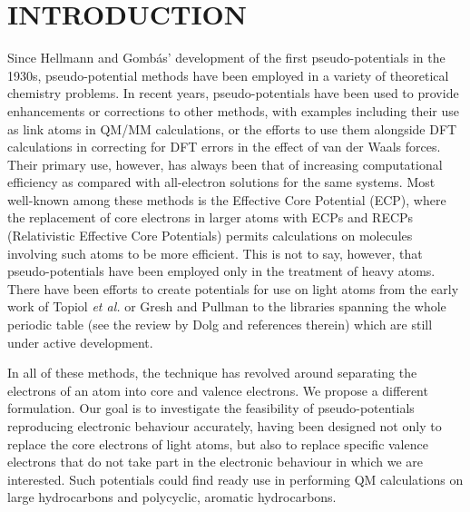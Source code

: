 \documentclass[12pt]{article}
\begin{document}
\makeatletter
\renewcommand\@biblabel[1]{#1.}
\makeatother



\renewcommand{\baselinestretch}{1.5}
\normalsize

\clearpage

\section*{\sffamily \Large INTRODUCTION}

Since Hellmann and Gomb\'as' development of the first pseudo-potentials in the 1930s,\cite{hellmann_1935, gombas_1935} pseudo-potential methods have been employed in a variety of theoretical chemistry problems. In recent years, pseudo-potentials have been used to provide enhancements or corrections to other methods, with examples including their use as link atoms in QM/MM calculations,\cite{chung_oniom_2015,
ihrig_specific_2011,
zhang_pseudobond_1998,
dilabio_simple_2002,
dilabio_efficient_2005,
gao_generalized_1998,
assfeld_quantum_1996,
jacob_calculation_2006,
von_lilienfeld_variational_2004,
von_lilienfeld_performance_2005,
von_lilienfeld_optimization_2004,
goedecker_separable_1996,
hartwigsen_relativistic_1998,
singh_combined_1986,
zhang_improved_2004,
parks_pseudobond_2008,
hitzenberger_optimizing_2016,
hitzenberger_probing_2015,
collins_energy-based_2015,
pezeshki_recent_2015,
von_lilienfeld_force_2013} or the efforts to use them alongside DFT calculations in correcting for DFT errors in the effect of van der Waals forces.\cite{dilabio_2008} Their primary use, however, has always been that of increasing computational efficiency as compared with all-electron solutions for the same systems. Most well-known among these methods is the Effective Core Potential (ECP),\cite{dolg_2000} where the replacement of core electrons in larger atoms with ECPs and RECPs (Relativistic Effective Core Potentials) permits calculations on molecules involving such atoms to be more efficient.
This is not to say, however, that pseudo-potentials have been employed only in the treatment of heavy atoms. There have been efforts to create potentials for use on light
atoms from the early work of Topiol \emph{et al.} or Gresh and Pullman \cite{topiol_1976, gresh_1978}
to the libraries spanning the whole periodic table (see the review by Dolg\cite{dolg_relativistic_2012} and references therein) which are still under active development.\cite{zou_open_2018}

In all of these methods, the technique has revolved around separating the electrons of an atom into core and valence electrons. We propose a different formulation. Our goal is to investigate the feasibility of pseudo-potentials reproducing electronic behaviour accurately, having been designed not only to replace the core electrons of light atoms, but also to replace specific valence electrons that do not take part in the electronic behaviour in which we are interested. Such potentials could find ready use in performing QM calculations on large hydrocarbons and polycyclic, aromatic hydrocarbons.
\end{document}
